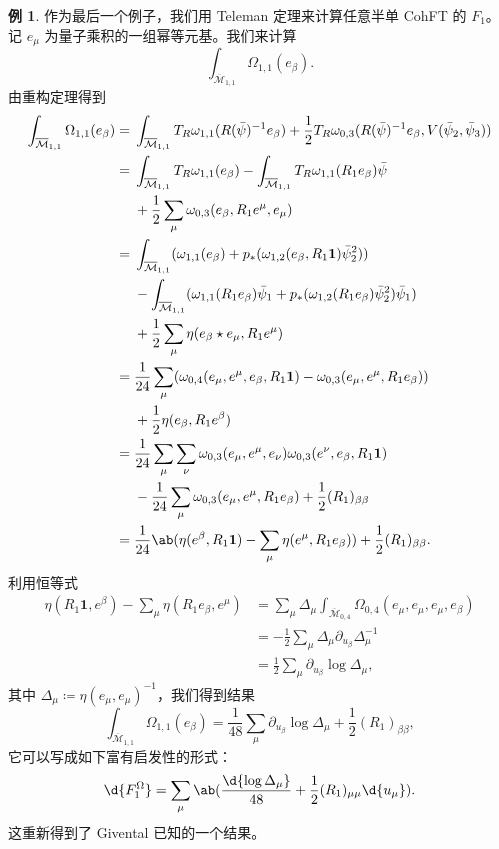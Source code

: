 \documentclass{amsart}
\theoremstyle{definition}
\newtheorem{exm}[thm]{例}
\theoremstyle{remark}
\theoremstyle{plain}
\theoremstyle{definition}
\theoremstyle{remark}
\newcommand{\Mbar}{\overline{\mathcal{M}}}
\newcommand{\1}{\mathbf{1}}
\newcommand{\2}{\mathbf{2}}
\newcommand{\3}{\mathbf{3}}
\begin{document}
\begin{exm}
    作为最后一个例子，我们用 Teleman 定理来计算任意半单 CohFT 的 $F_1$。记 $e_{\mu}$ 为量子乘积的一组幂等元基。我们来计算
    \[ \int_{\Mbar_{1,1}} \Omega_{1,1}(e_{\beta}). \]
    由重构定理得到
    \begin{align*}
        \int_{\Mbar_{1,1}}\Omega_{1,1}(e_{\beta}) ={}& \int_{\Mbar_{1,1}} T_R \omega_{1,1}(R(\bar{\psi})^{-1} e_{\beta}) + \frac{1}{2} T_R \omega_{0,3}(R(\bar{\psi})^{-1} e_{\beta}, V(\bar{\psi}_2, \bar{\psi}_3)) \\
        ={}& \int_{\Mbar_{1,1}}T_R\omega_{1,1}(e_{\beta}) - \int_{\Mbar_{1,1}} T_R \omega_{1,1}(R_1 e_{\beta})\bar{\psi} \\ 
        &+ \frac{1}{2}\sum_{\mu}  \omega_{0,3}(e_{\beta}, R_1 e^{\mu}, e_{\mu}) \\
        ={}& \int_{\Mbar_{1,1}} ( \omega_{1,1}(e_{\beta}) + p_* ( \omega_{1,2}(e_{\beta}, R_1 \1) \bar{\psi}_2^2 )) \\
        &- \int_{\Mbar_{1,1}} (\omega_{1,1}(R_1 e_{\beta})\bar{\psi}_1 + p_* ( \omega_{1,2}(R_1 e_{\beta}) \bar{\psi}_2^2 ) \bar{\psi}_1) \\
        &+ \frac{1}{2} \sum_{\mu} \eta(e_{\beta} \star e_{\mu}, R_1 e^{\mu}) \\
        ={}& \frac{1}{24} \sum_{\mu} ( \omega_{0,4}(e_{\mu}, e^{\mu}, e_{\beta}, R_1 \1) -\omega_{0,3}(e_{\mu}, e^{\mu}, R_1 e_{\beta}) )\\
        &+ \frac{1}{2} \eta(e_{\beta}, R_1 e^{\beta}) \\
        ={}& \frac{1}{24} \sum_{\mu}\sum_{\nu} \omega_{0,3}(e_{\mu}, e^{\mu}, e_{\nu})\omega_{0,3}(e^{\nu}, e_{\beta}, R_1 \1) \\
        &-\frac{1}{24} \sum_{\mu} \omega_{0,3}(e_{\mu}, e^{\mu}, R_1 e_{\beta}) + \frac{1}{2} (R_1)_{\beta\beta} \\
        ={}& \frac{1}{24} \ab(\eta(e^{\beta}, R_1 \1) - \sum_{\mu} \eta(e^{\mu}, R_1 e_{\beta})) + \frac{1}{2} (R_1)_{\beta\beta}.
    \end{align*}
    利用恒等式
    \begin{align*}
        \eta(R_1 \1, e^{\beta}) - \sum_{\mu} \eta(R_1 e_{\beta}, e^{\mu}) &= \sum_{\mu} \Delta_{\mu} \int_{\Mbar_{0,4}} \Omega_{0,4}(e_{\mu}, e_{\mu}, e_{\mu}, e_{\beta}) \\
        &= -\frac{1}{2}\sum_{\mu} \Delta_{\mu} \partial_{u_{\beta}} \Delta_{\mu}^{-1} \\
        &= \frac{1}{2} \sum_{\mu} \partial_{u_{\beta}} \log \Delta_{\mu},
    \end{align*}
    其中 $\Delta_{\mu} \coloneqq \eta(e_{\mu}, e_{\mu})^{-1}$，我们得到结果
    \[ \int_{\Mbar_{1,1}} \Omega_{1,1}(e_{\beta}) = \frac{1}{48} \sum_{\mu} \partial_{u_{\beta}} \log \Delta_{\mu} + \frac{1}{2} (R_1)_{\beta\beta}, \]
    它可以写成如下富有启发性的形式：
    \[ \d{F_1^{\Omega}} = \sum_{\mu} \ab( \frac{\d{\log \Delta_{\mu}}}{48} + \frac{1}{2} (R_1)_{\mu\mu} \d{u_{\mu}} ). \]
    这重新得到了 Givental 已知的一个结果。
\end{exm}
\end{document}
